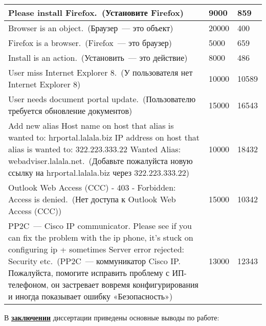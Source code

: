\begin{longtable}{|p{12cm}|p{2cm}|p{2cm}|}
  \hline
  Please install Firefox.~(Установите Firefox)   & 9000 & 859 \\
  \hline
  Browser is an object.~(Браузер~--- это объект)   & 20000 & 400 \\
  \hline
  Firefox is a browser.~(Firefox~--- это браузер)   & 5000 & 659  \\
  \hline
  Install is an action.~(Установить~--- это действие)   & 8000 & 486 \\
  \hline
  User miss Internet Explorer 8.~(У пользователя нет Internet Explorer 8)     & 10000 & 10589 \\
  \hline
  User needs document portal update.~(Пользователю требуется обновление документов)    & 15000 & 16543 \\
  \hline
  Add new alias Host name on host that alias is wanted to: hrportal.lalala.biz IP address on host that alias is wanted to: 322.223.333.22 Wanted Alias:    webadviser.lalala.net.~(Добавьте пожалуйста новую ссылку на hrportal.lalala.biz через 322.223.333.22)    & 10000 & 18432  \\ 
  \hline
  Outlook Web Access (CCC) - 403 - Forbidden: Access is denied.~(Нет доступа к Outlook Web Access (CCC)) & 15000 & 10342\\ 
  \hline
  PP2C~--- Cisco IP communicator. Please see if you can fix the problem with the ip phone, it's stuck on configuring ip + sometimes Server error rejected: Security etc.~(PP2C~--- коммуникатор Cisco IP. Пожалуйста, помогите исправить проблему с ИП-телефоном, он застревает вовремя конфигурирования и иногда показывает ошибку «Безопасность»)  & 13000 & 12343 \\ 
   \hline
  \end{longtable}

В \underline{\textbf{заключении}} диссертации приведены основные выводы по работе:


 

\renewcommand{\refname}{\large Публикации автора по теме диссертации}

\insertbiblioall

